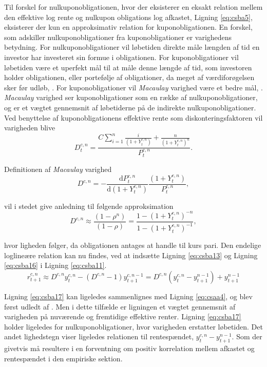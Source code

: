 \documentclass[
  a4paper,
  oneside]{memoir}
\begin{document}
Til forskel for nulkuponobligationen, hvor der eksisterer en eksakt relation mellem den effektive log rente og nulkupon obligations log afkastet, Ligning \eqref{eq:csba5}, eksisterer der kun en approksimativ relation for kuponobligationen. En forskel, som adskiller nulkuponobligationer fra kuponobligationer er varighedens betydning. For nulkuponobligationer vil løbetiden direkte måle længden af tid en investor har investeret sin formue i obligationen. For kuponobligationer vil løbetiden være et uperfekt mål til at måle denne længde af tid, som investoren holder obligationen, eller portefølje af obligationer, da meget af værdiforøgelsen sker før udløb, \citep{Campbell1997}. For kuponobligationer vil \emph{Macaulay} varighed være et bedre mål, \citep{Macaulay1938}. \emph{Macaulay} varighed ser kuponobligationer som en række af nulkuponobligationer, og er et vægtet gennemsnit af løbetiderne på de indirekte nulkuponobligationer. Ved benyttelse af kuponobligationens effektive rente som diskonteringsfaktoren vil varigheden blive
\begin{equation}
D_t^{c,n}=\frac{C\sum_{i=1}^n \frac{i}{(1+Y_t^{c,n})} + \frac{n}{(1+Y_t^{c,n})^n}}{P_t^{c,n}}. \label{eq:csba15}
\end{equation}

Definitionen af \emph{Macaulay} varighed
\[D^{c,n}=-\frac{\text{d} P_t^{c,n}}{\text{d} (1+Y_t^{c,n})}\frac{(1+Y_t^{c,n})}{P_t^{c,n}},\]

vil i stedet give anledning til følgende approksimation
\begin{equation}
D^{c,n}\approx \frac{(1-\rho^n)}{(1-\rho)} = \frac{1-(1+Y_t^{c,n})^{-n}}{1-(1+Y_t^{c,n})^{-1}}, \label{eq:csba16}
\end{equation}

hvor ligheden følger, da obligationen antages at handle til kurs pari. Den endelige loglineære relation kan nu findes, ved at indsætte Ligning \eqref{eq:csba13} og Ligning \eqref{eq:csba16} i Ligning \eqref{eq:csba11}.
\begin{equation}
r_{t+1}^{c,n}\approx D^{c,n} y_t^{c,n} - \left(D^{c,n} - 1\right) y_{t+1}^{c,n-1}=D^{c,n}(y_t^{c,n}- y_{t+1}^{n-1}) + y_{t+1}^{n-1}  \label{eq:csba17}
\end{equation}

Ligning \eqref{eq:csba17} kan ligeledes sammenlignes med Ligning \eqref{eq:csaa4}, og blev først udledt af \citep{Campbell1983}. Men i dette tilfælde er ligningen et vægtet gennemsnit af varigheden på nuværende og fremtidige effektive renter. Ligning \eqref{eq:csba17} holder ligeledes for nulkuponobligationer, hvor varigheden erstatter løbetiden. Det andet lighedstegn viser ligeledes relationen til rentespændet, \(y_t^{c,n}- y_{t+1}^{n-1}\). Som der givetvis må resultere i en forventning om positiv korrelation mellem afkastet og rentespændet i den empiriske sektion.
\end{document}
